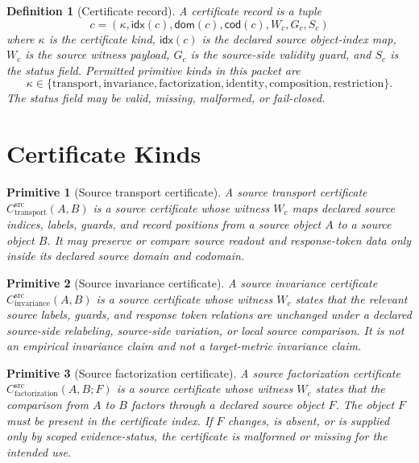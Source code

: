 \documentclass[11pt]{article}
\newcommand{\Cdom}{\mathsf{dom}}
\newcommand{\Ccod}{\mathsf{cod}}
\newcommand{\Cidx}{\mathsf{idx}}
\newcommand{\CTr}{C_{\mathrm{transport}}^{\mathrm{src}}}
\newcommand{\CInv}{C_{\mathrm{invariance}}^{\mathrm{src}}}
\newcommand{\CFact}{C_{\mathrm{factorization}}^{\mathrm{src}}}
\newtheorem{definition}{Definition}
\newtheorem{primitive}{Primitive}
\begin{document}
\begin{definition}[Certificate record]
A certificate record is a tuple
\[
  c=(\kappa,\Cidx(c),\Cdom(c),\Ccod(c),W_c,G_c,S_c)
\]
where \(\kappa\) is the certificate kind, \(\Cidx(c)\) is the declared source
object-index map, \(W_c\) is the source witness payload, \(G_c\) is the
source-side validity guard, and \(S_c\) is the status field. Permitted
primitive kinds in this packet are
\[
  \kappa\in
  \{\mathrm{transport},\mathrm{invariance},\mathrm{factorization},
  \mathrm{identity},\mathrm{composition},\mathrm{restriction}\}.
\]
The status field may be valid, missing, malformed, or fail-closed.
\end{definition}

\section{Certificate Kinds}

\begin{primitive}[Source transport certificate]
A source transport certificate \(\CTr(A,B)\) is a source certificate whose
witness \(W_c\) maps declared source indices, labels, guards, and record
positions from a source object \(A\) to a source object \(B\). It may preserve
or compare source readout and response-token data only inside its declared
source domain and codomain.
\end{primitive}

\begin{primitive}[Source invariance certificate]
A source invariance certificate \(\CInv(A,B)\) is a source certificate whose
witness \(W_c\) states that the relevant source labels, guards, and response
token relations are unchanged under a declared source-side relabeling,
source-side variation, or local source comparison. It is not an empirical
invariance claim and not a target-metric invariance claim.
\end{primitive}

\begin{primitive}[Source factorization certificate]
A source factorization certificate \(\CFact(A,B;F)\) is a source certificate
whose witness \(W_c\) states that the comparison from \(A\) to \(B\) factors
through a declared source object \(F\). The object \(F\) must be present in
the certificate index. If \(F\) changes, is absent, or is supplied only by
scoped evidence-status, the certificate is malformed or missing for the
intended use.
\end{primitive}
\end{document}
